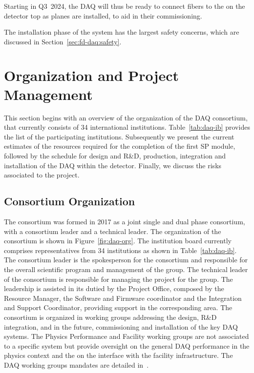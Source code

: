 Starting in Q3~2024, the DAQ will thus be ready to connect fibers to the
 on the detector top as planes are installed, to aid in
their commissioning.

The installation phase of the  system has the largest safety
concerns, which are discussed in Section~\ref{sec:fd-daq:safety}.

\section{Organization and Project Management}
\label{sec:sp-daq:organization}

This section begins with an overview of the organization of the DAQ consortium, that currently consists of 34 international institutions. Table~\ref{tab:daq-ib} provides the list of the participating institutions. Subsequently we present the current estimates of the resources required for the completion of the first SP module, followed by the schedule for design and R\&D, production, integration and installation of the DAQ within the detector. Finally, we discuss the risks associated to the project.

\subsection{Consortium Organization}

The  consortium was formed in 2017 as a joint single and
dual phase consortium, with a consortium leader and a technical
leader. The organization of the consortium is shown in
Figure~\ref{fig:daq-org}. The  institution board currently comprises
representatives from 34 institutions as shown in Table~\ref{tab:daq-ib}. The consortium leader is the spokesperson for the consortium and responsible for the overall scientific program and management of the group. The technical leader of the consortium is responsible for
managing the project for the group. The leadership is assisted in its dutied by the Project Office, composed by the Resource Manager, the Software and Firmware coordinator and the Integration and Support Coordinator, providing support in the corresponding area. 
The consortium is organized in working groups addressing the design, R\&D integration, and in the future, commissioning and installation of the key DAQ systems. The Physics Performance and Facility working groups are not associated to a specific system but provide oversight on the general DAQ performance in the physics context and the on the interface with the facility infrastructure. The DAQ working groups mandates are detailed in~.

